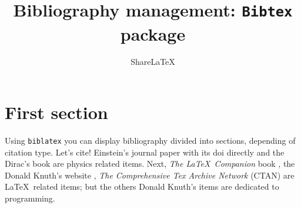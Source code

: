 \documentclass{article}
\title{Bibliography management: \texttt{Bibtex} package}
\author{Share\LaTeX}
\date{ }
\begin{document}
\maketitle

\tableofcontents

\section{First section}

Using \texttt{biblatex} you can display bibliography divided into sections, depending of citation type. 
Let's cite! Einstein's journal paper with its doi directly \cite{10.1002/andp.19053221004} and the Dirac's book \cite{dirac} are physics related items. 
Next, \textit{The \LaTeX\ Companion} book \cite{latexcompanion}, the Donald Knuth's website \cite{knuthwebsite}, \textit{The Comprehensive Tex Archive Network} (CTAN) \cite{ctan} are \LaTeX\ related items; but the others Donald Knuth's items \cite{knuth-fa,knuth-acp} are dedicated to programming. 


\medskip





\end{document}
